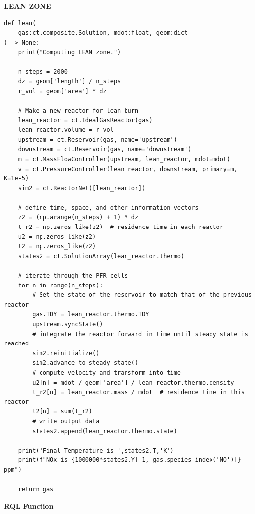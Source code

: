 \clearpage

\textbf{LEAN ZONE}

\begin{verbatim}
def lean(
    gas:ct.composite.Solution, mdot:float, geom:dict
) -> None:
    print("Computing LEAN zone.")

    n_steps = 2000
    dz = geom['length'] / n_steps
    r_vol = geom['area'] * dz

    # Make a new reactor for lean burn
    lean_reactor = ct.IdealGasReactor(gas)
    lean_reactor.volume = r_vol
    upstream = ct.Reservoir(gas, name='upstream')
    downstream = ct.Reservoir(gas, name='downstream')
    m = ct.MassFlowController(upstream, lean_reactor, mdot=mdot)
    v = ct.PressureController(lean_reactor, downstream, primary=m, K=1e-5)
    sim2 = ct.ReactorNet([lean_reactor])

    # define time, space, and other information vectors
    z2 = (np.arange(n_steps) + 1) * dz
    t_r2 = np.zeros_like(z2)  # residence time in each reactor
    u2 = np.zeros_like(z2)
    t2 = np.zeros_like(z2)
    states2 = ct.SolutionArray(lean_reactor.thermo)

    # iterate through the PFR cells
    for n in range(n_steps):
        # Set the state of the reservoir to match that of the previous reactor
        gas.TDY = lean_reactor.thermo.TDY
        upstream.syncState()
        # integrate the reactor forward in time until steady state is reached
        sim2.reinitialize()
        sim2.advance_to_steady_state()
        # compute velocity and transform into time
        u2[n] = mdot / geom['area'] / lean_reactor.thermo.density
        t_r2[n] = lean_reactor.mass / mdot  # residence time in this reactor
        t2[n] = sum(t_r2)
        # write output data
        states2.append(lean_reactor.thermo.state)

    print('Final Temperature is ',states2.T,'K')
    print(f"NOx is {1000000*states2.Y[-1, gas.species_index('NO')]} ppm")

    return gas
\end{verbatim}


\clearpage


\textbf{RQL Function}

